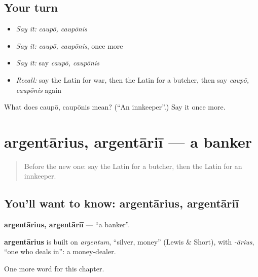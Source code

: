 \subsection*{Your turn}
\begin{itemize}
\raggedright
  \item \emph{Say it:} \emph{caupō, caupōnis}
  \item \emph{Say it:} \emph{caupō, caupōnis}, once more
  \item \emph{Say it:} say \emph{caupō, caupōnis}
  \item \emph{Recall:} say the Latin for war, then the Latin for a butcher, then say \emph{caupō, caupōnis} again
\end{itemize}

\begin{tcolorbox}[breakable,colback=teal!4,colframe=teal!35!black,title={Before you move on}]
What does caupō, caupōnis mean? (\textquotedblleft{}An innkeeper\textquotedblright{}.) Say it once more.
\end{tcolorbox}
\section[argentārius, argentāriī]{argentārius, argentāriī — a banker}

\label{lesson:LA-C272-argentarius}



\begin{quote}
Before the new one: say the Latin for a butcher, then the Latin for an innkeeper.
\end{quote}

\subsection*{You'll want to know: argentārius, argentāriī}
\textbf{argentārius, argentāriī} — \textquotedblleft{}a banker\textquotedblright{}.

\begin{cousinweb}
\textbf{argentārius} is built on \emph{argentum}, \textquotedblleft{}silver, money\textquotedblright{} (Lewis \& Short), with \emph{-ārius}, \textquotedblleft{}one who deals in\textquotedblright{}: a money-dealer.
\end{cousinweb}

\begin{grammarlens}[title={What you've built}]
One more word for this chapter.
\end{grammarlens}

